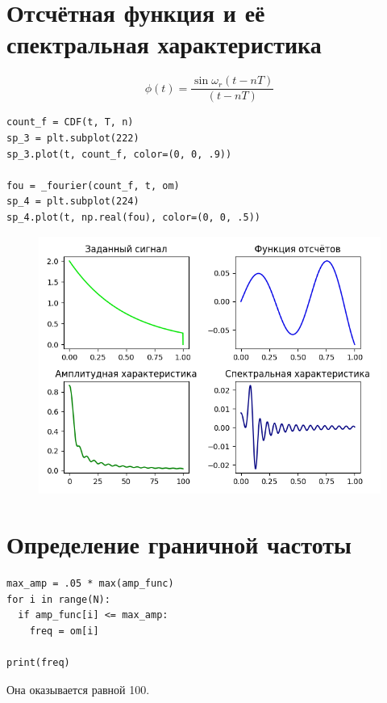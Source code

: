 \documentclass[12pt]{article}
\begin{document}
\begin{figure}[!htb]
\centering
\caption{}
\label{}
\end{figure}

\begin{figure}[!htb]
\centering
\caption{}
\label{}
\end{figure}

\section{ Отсчётная функция и её спектральная характеристика }

\[\phi(t) = \frac{\sin \omega_r (t-nT)}{(t-nT)} \]


\begin{lstlisting}
count_f = CDF(t, T, n)
sp_3 = plt.subplot(222)
sp_3.plot(t, count_f, color=(0, 0, .9))

fou = _fourier(count_f, t, om)
sp_4 = plt.subplot(224)
sp_4.plot(t, np.real(fou), color=(0, 0, .5))
\end{lstlisting}

\begin{figure}[htp]
\centering
\includegraphics[scale=1.00]{first-group.png}
\caption{}
\label{}
\end{figure}

\section{ Определение граничной частоты }

\begin{lstlisting}
max_amp = .05 * max(amp_func)
for i in range(N):
  if amp_func[i] <= max_amp:
    freq = om[i]

print(freq)
\end{lstlisting}
Она оказывается равной 100.
\end{document}
